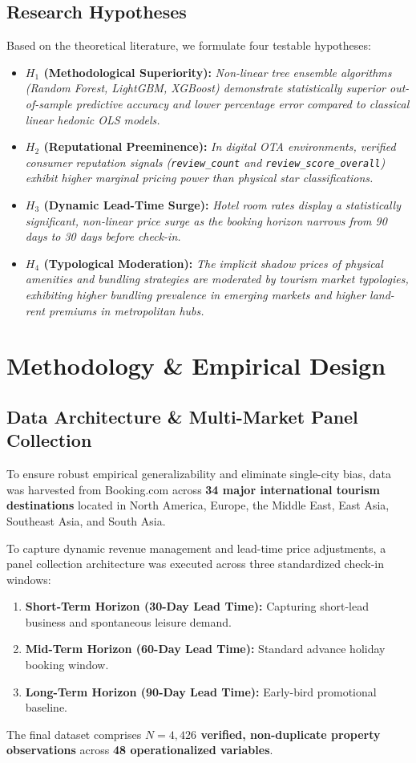 \documentclass[11pt,a4paper]{article}
\begin{document}
\subsection{Research Hypotheses}
Based on the theoretical literature, we formulate four testable hypotheses:
\begin{itemize}[leftmargin=*]
    \item \textbf{$H_1$ (Methodological Superiority):} \textit{Non-linear tree ensemble algorithms (Random Forest, LightGBM, XGBoost) demonstrate statistically superior out-of-sample predictive accuracy and lower percentage error compared to classical linear hedonic OLS models.}
    \item \textbf{$H_2$ (Reputational Preeminence):} \textit{In digital OTA environments, verified consumer reputation signals (\texttt{review\_count} and \texttt{review\_score\_overall}) exhibit higher marginal pricing power than physical star classifications.}
    \item \textbf{$H_3$ (Dynamic Lead-Time Surge):} \textit{Hotel room rates display a statistically significant, non-linear price surge as the booking horizon narrows from 90 days to 30 days before check-in.}
    \item \textbf{$H_4$ (Typological Moderation):} \textit{The implicit shadow prices of physical amenities and bundling strategies are moderated by tourism market typologies, exhibiting higher bundling prevalence in emerging markets and higher land-rent premiums in metropolitan hubs.}
\end{itemize}

\section{Methodology \& Empirical Design}

\subsection{Data Architecture \& Multi-Market Panel Collection}
To ensure robust empirical generalizability and eliminate single-city bias, data was harvested from Booking.com across \textbf{34 major international tourism destinations} located in North America, Europe, the Middle East, East Asia, Southeast Asia, and South Asia. 

To capture dynamic revenue management and lead-time price adjustments, a panel collection architecture was executed across three standardized check-in windows:
\begin{enumerate}
    \item \textbf{Short-Term Horizon (30-Day Lead Time):} Capturing short-lead business and spontaneous leisure demand.
    \item \textbf{Mid-Term Horizon (60-Day Lead Time):} Standard advance holiday booking window.
    \item \textbf{Long-Term Horizon (90-Day Lead Time):} Early-bird promotional baseline.
\end{enumerate}
The final dataset comprises \textbf{$N = 4,426$ verified, non-duplicate property observations} across \textbf{48 operationalized variables}.
\end{document}
